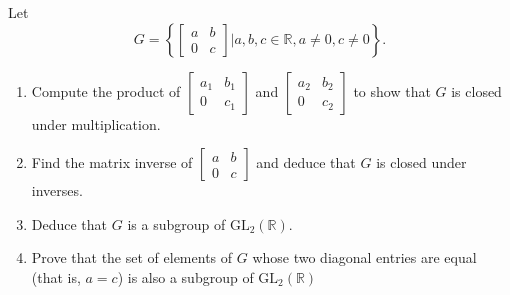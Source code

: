 \documentclass[12 pt, letterpaper]{hmcpset}
\begin{document}
\pagebreak

\begin{problem}
	Let
	\[
		G = \left \{ \begin{bmatrix}
				a & b \\
				0 & c
		\end{bmatrix} | a, b, c \in \mathbb R, a \neq 0, c \neq 0 \right \}.
	\]
	\begin{enumerate}
		\item 
			Compute the product of $\begin{bmatrix}
				a_1 & b_1 \\
				0 & c_1
		\end{bmatrix}$ and $\begin{bmatrix}
				a_2 & b_2 \\
				0 & c_2
		\end{bmatrix}$ to show that $G$ is closed under multiplication.
		\item 
			Find the matrix inverse of $\begin{bmatrix}
				a & b \\
				0 & c
		\end{bmatrix}$ and deduce that $G$ is closed under inverses.
		\item 
			Deduce that $G$ is a subgroup of $\mathrm{GL}_2(\mathbb R)$.
		\item
			Prove that the set of elements of $G$ whose two diagonal entries are equal (that is, $a = c$) is also a subgroup of $\mathrm{GL}_2(\mathbb R)$
	\end{enumerate}
\end{problem}
\end{document}
